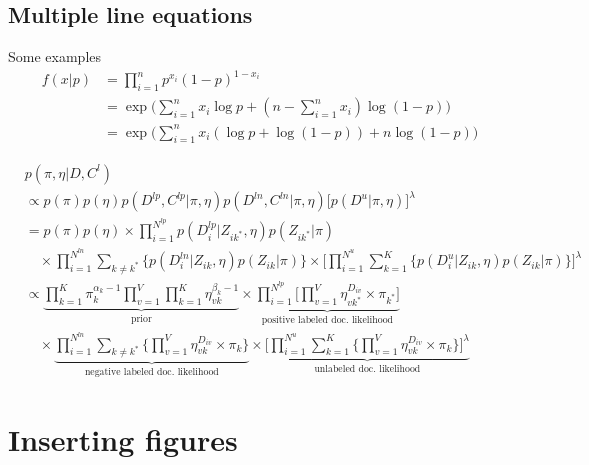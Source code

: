 \documentclass[11pt]{article}
\theoremstyle{quest}
\begin{document}
\subsection{Multiple line equations}
Some examples
\begin{equation}
\begin{split}
    f(x \vert p) &= \prod_{i=1}^n p^{x_i} (1-p)^{1-x_i} \\
    &= \exp\Big(\sum_{i=1}^n x_i \log p + (n-\sum_{i=1}^n x_i) \log(1-p)\Big) \\
    &= \exp\Big(\sum_{i=1}^n x_i (\log p + \log(1-p)) + n \log(1-p) \Big)
\end{split}
\end{equation}

\begin{equation}
\begin{split}
    &p(\pi, \eta \vert D, C^l) \\
    &\propto p(\pi) p(\eta) p(D^{lp}, C^{lp} \vert \pi, \eta) p(D^{ln}, C^{ln} \vert \pi, \eta) \Big[p(D^u \vert \pi, \eta)\Big]^{\lambda} \\
    &= p(\pi) p(\eta) 
    \times \prod_{i=1}^{N^{lp}} p(D_i^{lp} \vert Z_{ik^*}, \eta) p(Z_{ik^*} \vert \pi) \\
    &\quad \times \prod_{i=1}^{N^{ln}} \sum_{k \neq k^*} \Big\{ p(D_i^{ln} \vert Z_{ik}, \eta) p(Z_{ik} \vert \pi) \Big\} 
    \times \Bigg[\prod_{i=1}^{N^{u}} \sum_{k=1}^K \Big\{ p(D_i^{u} \vert Z_{ik}, \eta) p(Z_{ik} \vert \pi) \Big\} \Bigg]^{\lambda} \\
    &\propto \underbrace{\prod_{k=1}^K \pi_k^{\alpha_k - 1} \prod_{v=1}^V \prod_{k=1}^K \eta_{vk}^{\beta_k - 1}}_\text{prior}
    \times 
    \underbrace{\prod_{i=1}^{N^{lp}} \Big[ \prod_{v=1}^V \eta_{vk^*}^{D_{iv}}\times \pi_{k^*} \Big]}_\text{positive labeled doc. likelihood} \\
    &\quad \times \underbrace{\prod_{i=1}^{N^{ln}} \sum_{k \neq k^*} \Big\{ \prod_{v=1}^V \eta_{vk}^{D_{iv}}\times \pi_k \Big\}}_\text{negative labeled doc. likelihood} 
    \times \underbrace{\Bigg[\prod_{i=1}^{N^{u}} \sum_{k=1}^K \Big\{ \prod_{v=1}^V \eta_{vk}^{D_{iv}}\times \pi_k  \Big\}\Bigg]^{\lambda}
}_\text{unlabeled doc. likelihood}
\end{split}
\end{equation}

\newpage
\section{Inserting figures}
\end{document}
